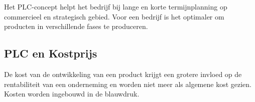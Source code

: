 \documentclass[../../samenvatting.tex]{subfiles}
\begin{document}
Het PLC-concept helpt het bedrijf bij lange en korte termijnplanning op commercieel en strategisch gebied. Voor een bedrijf is het optimaler om producten in verschillende fases te produceren.

\subsection{PLC en Kostprijs}

De kost van de ontwikkeling van een product krijgt een grotere invloed op de rentabiliteit van een onderneming en worden niet meer als algemene kost gezien. Kosten worden ingebouwd in de blauwdruk.
\end{document}
